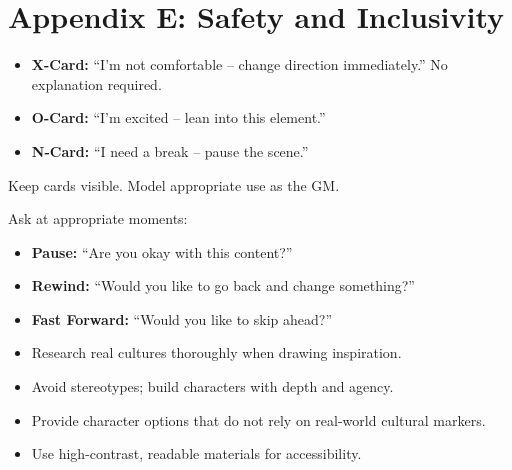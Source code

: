 \clearpage
\section*{Appendix E: Safety and Inclusivity}
\label{app:safety}

\begin{tcolorbox}[title=X-Card System, colback=white!97!gray, colframe=black!80!gray,breakable]
\begin{itemize}
  \item \textbf{X-Card:} ``I'm not comfortable -- change direction immediately.'' No explanation required.
  \item \textbf{O-Card:} ``I'm excited -- lean into this element.''
  \item \textbf{N-Card:} ``I need a break -- pause the scene.''
\end{itemize}
Keep cards visible. Model appropriate use as the GM.
\end{tcolorbox}

\begin{tcolorbox}[title=Script Change, colback=white!97!gray, colframe=black!80!gray,breakable]
Ask at appropriate moments:
\begin{itemize}
  \item \textbf{Pause:} ``Are you okay with this content?''
  \item \textbf{Rewind:} ``Would you like to go back and change something?''
  \item \textbf{Fast Forward:} ``Would you like to skip ahead?''
\end{itemize}
\end{tcolorbox}

\begin{tcolorbox}[title=Inclusive Worldbuilding, colback=white!97!gray, colframe=black!80!gray,breakable]
\begin{itemize}
  \item Research real cultures thoroughly when drawing inspiration.
  \item Avoid stereotypes; build characters with depth and agency.
  \item Provide character options that do not rely on real-world cultural markers.
  \item Use high-contrast, readable materials for accessibility.
\end{itemize}
\end{tcolorbox}

